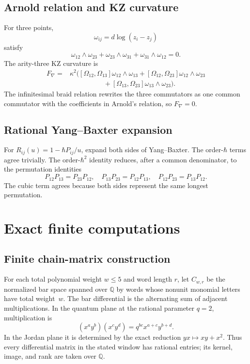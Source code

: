 \section{Arnold relation and KZ curvature}
For three points,
\[
 \omega_{ij}=d\log(z_i-z_j)
\]
satisfy
\[
 \omega_{12}\wedge\omega_{23}
 +\omega_{23}\wedge\omega_{31}
 +\omega_{31}\wedge\omega_{12}=0.
\]
The arity-three KZ curvature is
\begin{align*}
 F_\nabla={}&\kappa^2\bigl(
 [\Omega_{12},\Omega_{13}]\omega_{12}\wedge\omega_{13}
 +[\Omega_{12},\Omega_{23}]\omega_{12}\wedge\omega_{23}\\
 &\hspace{5em}+[\Omega_{13},\Omega_{23}]\omega_{13}\wedge\omega_{23}
 \bigr).
\end{align*}
The infinitesimal braid relation rewrites the three commutators as one common commutator with the coefficients in Arnold's relation, so \(F_\nabla=0\).

\section{Rational Yang--Baxter expansion}
For \(R_{ij}(u)=1-\hbar P_{ij}/u\), expand both sides of Yang--Baxter.  The order-\(\hbar\) terms agree trivially.  The order-\(\hbar^2\) identity reduces, after a common denominator, to the permutation identities
\[
 P_{12}P_{13}=P_{23}P_{12},
 \quad
 P_{13}P_{23}=P_{12}P_{13},
 \quad
 P_{12}P_{23}=P_{13}P_{12}.
\]
The cubic term agrees because both sides represent the same longest permutation.

\chapter{Exact finite computations}\label{app:computations}

\section{Finite chain-matrix construction}
For each total polynomial weight \(w\leq5\) and word length \(r\), let
\(C_{w,r}\) be the normalized bar space spanned over \(\mathbb Q\) by words
whose nonunit monomial letters have total weight~\(w\).  The bar differential
is the alternating sum of adjacent multiplications.  In the quantum plane at
the rational parameter \(q=2\), multiplication is
\[
 (x^ay^b)(x^cy^d)=q^{bc}x^{a+c}y^{b+d}.
\]
In the Jordan plane it is determined by the exact reduction
\(yx\mapsto xy+x^2\).  Thus every differential matrix in the stated window
has rational entries; its kernel, image, and rank are taken over \(\mathbb Q\).

